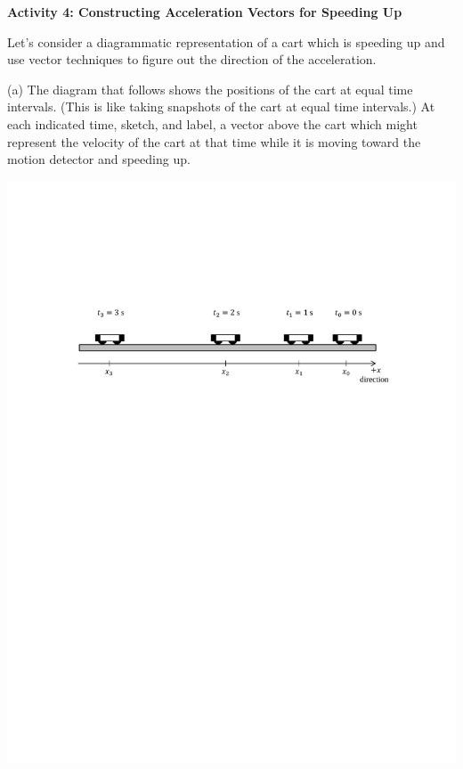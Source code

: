 \pagebreak[2]
\textbf{Activity 4: Constructing Acceleration Vectors for Speeding Up} 

Let's consider a diagrammatic representation of a cart which is speeding up
and use vector techniques to figure out the direction of the acceleration.

(a) The diagram that follows shows the positions of the cart at equal time intervals.
(This is like taking snapshots of the cart at equal time intervals.) At each
indicated time, sketch, and label, a vector above the cart which might represent the velocity
of the cart at that time while it is moving toward the motion detector and speeding
up.

{\par\centering \includegraphics{slowing/carts_speeding.pdf} \par}

